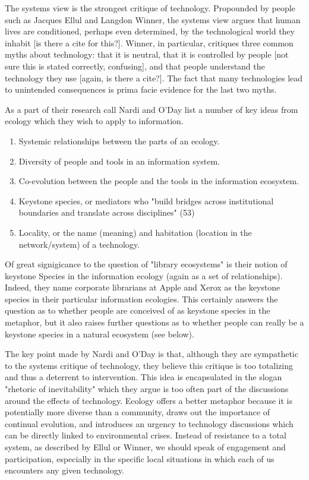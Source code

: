 The systems view is the strongest critique of technology. Propounded by people such as Jacques Ellul and Langdon Winner, the systems view argues that human lives are conditioned, perhaps even determined, by the technological world they inhabit [is there a cite for this?]. Winner, in particular, critiques three common myths about technology: that it is neutral, that it is controlled by people [not sure this is stated correctly, confusing], and that people understand the technology they use [again, is there a cite?]. The fact that many technologies lead to unintended consequences is prima facie evidence for the last two myths.

As a part of their research call Nardi and O'Day list a number of key ideas from ecology which they wish to apply to information.

\begin{enumerate}
\item Systemic relationships between the parts of an ecology.
\item Diversity of people and tools in an information system.
\item Co-evolution between the people and the tools in the information ecosystem.
\item Keystone species, or mediators who "build bridges across institutional boundaries and translate across disciplines" (53)
\item Locality, or the name (meaning) and habitation (location in the network/system) of a technology.
\end{enumerate}

Of great signigicance to the question of "library ecosystems" is their notion of keystone Species in the information ecology (again as a set of relationships). Indeed, they name corporate librarians at Apple and Xerox as the keystone species in their particular information ecologies. This certainly answers the question as to whether people are conceived of as keystone species in the metaphor, but it also raises further questions as to whether people can really be a keystone species in a natural ecosystem (see below).

The key point made by Nardi and O'Day is that, although they are sympathetic to the systems critique of technology, they believe this critique is too totalizing and thus a deterrent to intervention. This idea is encapsulated in the slogan "rhetoric of inevitability" which they argue is too often part of the discussions around the effects of technology. Ecology offers a better metaphor because it is potentially more diverse than a community, draws out the importance of continual evolution, and introduces an urgency to technology discussions which can be directly linked to environmental crises. Instead of resistance to a total system, as described by Ellul or Winner, we should speak of engagement and participation, especially in the specific local situations in which each of us encounters any given technology.

